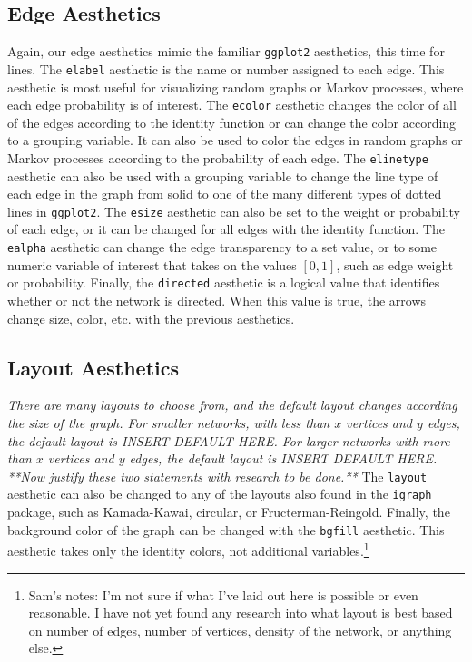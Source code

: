 \documentclass[11pt]{article}\usepackage[]{graphicx}\usepackage[]{color}
\begin{document}
  \subsection{Edge Aesthetics}
  Again, our edge aesthetics mimic the familiar \texttt{ggplot2} aesthetics, this time for lines.  The \texttt{elabel} aesthetic is the name or number assigned to each edge.  This aesthetic is most useful for visualizing random graphs or Markov processes, where each edge probability is of interest.  The \texttt{ecolor} aesthetic changes the color of all of the edges according to the identity function or can change the color according to a grouping variable.  It can also be used to color the edges in random graphs or Markov processes according to the probability of each edge. The \texttt{elinetype} aesthetic can also be used with a grouping variable to change the line type of each edge in the graph from solid to one of the many different types of dotted lines in \texttt{ggplot2}.  The \texttt{esize} aesthetic can also be set to the weight or probability of each edge, or it can be changed for all edges with the identity function.  The \texttt{ealpha} aesthetic can change the edge transparency to a set value, or to some numeric variable of interest that takes on the values $[0,1]$, such as edge weight or probability.  Finally, the \texttt{directed} aesthetic is a logical value that identifies whether or not the network is directed.  When this value is true, the arrows change size, color, etc. with the previous aesthetics. 
  
  \subsection{Layout Aesthetics}
  \emph{There are many layouts to choose from, and the default layout changes according the size of the graph.  For smaller networks, with less than $x$ vertices and $y$ edges, the default layout is INSERT DEFAULT HERE. For larger networks with more than $x$ vertices and $y$ edges, the default layout is INSERT DEFAULT HERE. **Now justify these two statements with research to be done.**} The \texttt{layout} aesthetic can also be changed to any of the layouts also found in the \texttt{igraph} package, such as Kamada-Kawai, circular, or Fructerman-Reingold. Finally, the background color of the graph can be changed with the \texttt{bgfill} aesthetic.  This aesthetic takes only the identity colors, not additional variables.\footnote{Sam's notes: I'm not sure if what I've laid out here is possible or even reasonable.  I have not yet found any research into what layout is best based on number of edges, number of vertices, density of the network, or anything else.} 
\end{document}

